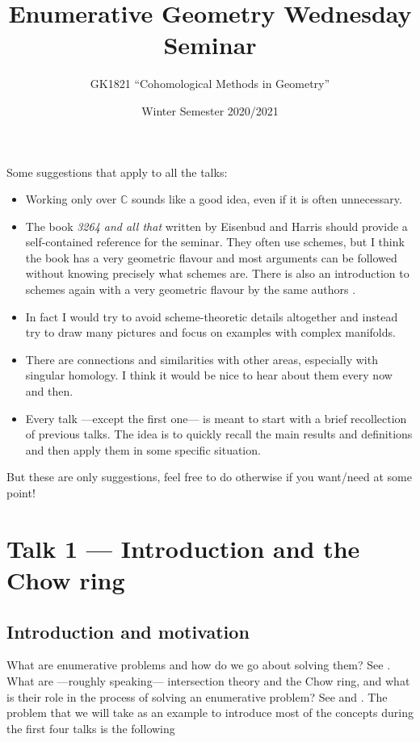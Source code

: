 \documentclass[A4paper, 12pt, british, reqno]{amsart}
\author{GK1821 ``Cohomological Methods in Geometry''}
\title[Enumerative Geometry Wednesday Seminar]{Enumerative Geometry Wednesday Seminar}
\date{Winter Semester 2020/2021}
\newcommand{\C}{\mathbb{C}} %
\theoremstyle{plain}
\theoremstyle{definition}
\theoremstyle{remark}
\theoremstyle{plain}
\theoremstyle{definition}
\theoremstyle{remark}
\theoremstyle{plain}
\theoremstyle{definition}
\theoremstyle{remark}
\begin{document}

\maketitle

\vspace{-3mm}

\tableofcontents

\vspace{-9mm}

Some suggestions that apply to all the talks:
\begin{itemize}
    \item Working only over $\C$ sounds like a good idea, even if it is often unnecessary.
    \item The book \textit{3264 and all that} written by Eisenbud and Harris \cite{eh16} should provide a self-contained reference for the seminar.
	They often use schemes, but I think the book has a very geometric flavour and most arguments can be followed without knowing precisely what schemes are.
	There is also an introduction to schemes again with a very geometric flavour by the same authors \cite{eh00}.
    \item In fact I would try to avoid scheme-theoretic details altogether and instead try to draw many pictures and focus on examples with complex manifolds.
    \item There are connections and similarities with other areas, especially with singular homology.
	I think it would be nice to hear about them every now and then.
    \item Every talk ---except the first one--- is meant to start with a brief recollection of previous talks.
	The idea is to quickly recall the main results and definitions and then apply them in some specific situation.
\end{itemize}

But these are only suggestions, feel free to do otherwise if you want/need at some point!

\section{Talk 1 --- Introduction and the Chow ring}

\subsection{Introduction and motivation}
What are enumerative problems and how do we go about solving them?
See \cite[\S 3.1.1]{eh16}.
What are ---roughly speaking--- intersection theory and the Chow ring, and what is their role in the process of solving an enumerative problem?
See \cite[\S 1.1]{eh16} and \cite[\S 3.1.1]{eh16}.
The problem that we will take as an example to introduce most of the concepts during the first four talks is the following
\end{document}
